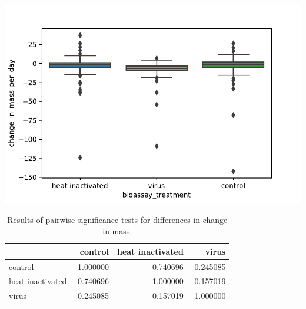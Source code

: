 \documentclass[11pt]{scrartcl}
\begin{document}
    \begin{center}
         \includegraphics[width=\textwidth]{bp.pdf}
    \end{center}

    \begin{table}[h!]
        \centering
        \caption{Results of pairwise significance tests for differences in change in mass.}
    \begin{tabular}{lrrr}
\toprule
{} &   control &  heat inactivated &     virus \\
\midrule
control          & -1.000000 &          0.740696 &  0.245085 \\
heat inactivated &  0.740696 &         -1.000000 &  0.157019 \\
virus            &  0.245085 &          0.157019 & -1.000000 \\
\bottomrule
\end{tabular}

    \end{table}
    
\end{document}
